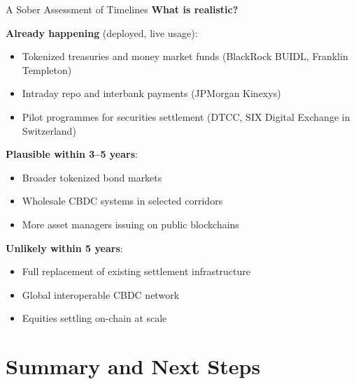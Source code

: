 \documentclass[10pt]{beamer}
\begin{document}
\begin{frame}{A Sober Assessment of Timelines}
  \textbf{What is realistic?}
  
  \vspace{0.5em}
  \textbf{Already happening} (deployed, live usage):
  \begin{itemize}
    \item Tokenized treasuries and money market funds (BlackRock BUIDL, Franklin Templeton)
    \item Intraday repo and interbank payments (JPMorgan Kinexys)
    \item Pilot programmes for securities settlement (DTCC, SIX Digital Exchange in Switzerland)
  \end{itemize}
  
  \vspace{0.5em}
  \textbf{Plausible within 3--5 years}:
  \begin{itemize}
    \item Broader tokenized bond markets
    \item Wholesale CBDC systems in selected corridors
    \item More asset managers issuing on public blockchains
  \end{itemize}
  
  \vspace{0.5em}
  \textbf{Unlikely within 5 years}:
  \begin{itemize}
    \item Full replacement of existing settlement infrastructure
    \item Global interoperable CBDC network
    \item Equities settling on-chain at scale
  \end{itemize}
  
\end{frame}

\section{Summary and Next Steps}
\end{document}
